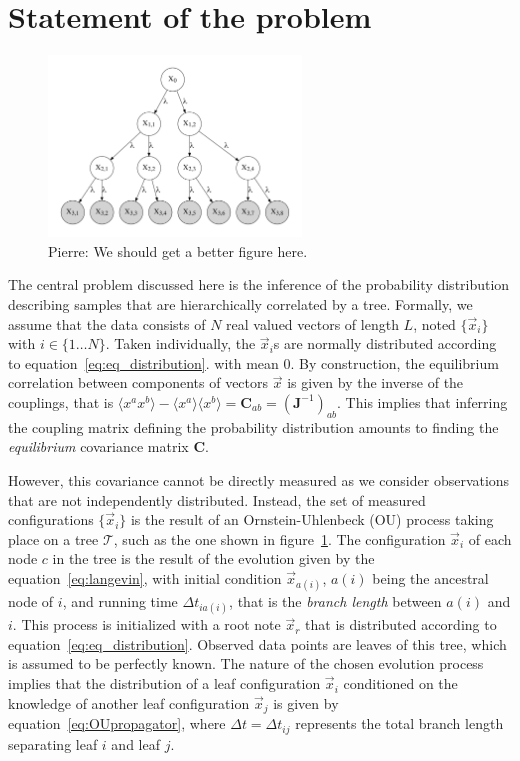 \documentclass[preprint,amsmath,amssymb,superscriptaddress,showpacs,pre]{revtex4-1}
\def\vx{\vec x}
\newcommand{\pierre}[1]{{\color{red}Pierre: #1}}
\begin{document}
\section{Statement of the problem}
\label{statement of the problem}

\begin{figure}[!htb]
	\includegraphics[width=0.6\textwidth]{Figures/tree.pdf}
	\caption{ \pierre{We should get a better figure here.}}
	\label{fig:sample_tree}
\end{figure}


The central problem discussed here is the inference of the probability distribution describing samples that are hierarchically correlated by a tree. 
Formally, we assume that the data consists of $N$ real valued vectors of length $L$, noted $\{\vx_i\}$ with $i\in\{1\ldots N\}$. 
Taken individually, the $\vx_i$s are normally distributed according to equation~\ref{eq:eq_distribution}. with mean $0$.
By construction, the equilibrium correlation between components of vectors $\vx$ is given by the inverse of the couplings, that is $\langle x^a x^b\rangle-\langle x^a\rangle\langle x^b\rangle = \bm C_{ab} = (\bm J^{-1})_{ab}$. 
This implies that inferring the coupling matrix defining the probability distribution amounts to finding the \emph{equilibrium} covariance matrix $\mathbf{C}$.  

However, this covariance cannot be directly measured as we consider observations that are not independently distributed.
Instead, the set of measured configurations $\{\vx_i\}$ is the result of an Ornstein-Uhlenbeck (OU) process taking place on a tree $\mathcal{T}$, such as the one shown in figure~\ref{fig:sample_tree}. 
The configuration $\vx_i$ of each node $c$ in the tree is the result of the evolution given by the equation~\ref{eq:langevin}, with initial condition $\vx_{a(i)}$, $a(i)$ being the ancestral node of $i$, and running time $\Delta t_{ia(i)}$, that is the \emph{branch length} between $a(i)$ and $i$. 
This process is initialized with a root note $\vx_r$ that is distributed according to equation~\ref{eq:eq_distribution}.
Observed data points are leaves of this tree, which is assumed to be perfectly known.
The nature of the chosen evolution process implies that the distribution of a leaf configuration $\vx_i$ conditioned on the knowledge of another leaf configuration $\vx_j$ is given by equation~\ref{eq:OUpropagator}, where $\Delta t=\Delta t_{ij}$ represents the total branch length separating leaf $i$ and leaf $j$.
\end{document}
